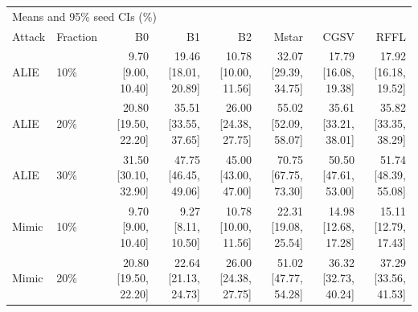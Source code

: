 \begin{tabular}{llrrrrrr}
\toprule
\multicolumn{8}{l}{Means and 95\% seed CIs (\%)} \\
Attack & Fraction & B0 & B1 & B2 & Mstar & CGSV & RFFL \\
\midrule
ALIE & 10\% & \shortstack{9.70\\{}[9.00, 10.40]} & \shortstack{19.46\\{}[18.01, 20.89]} & \shortstack{10.78\\{}[10.00, 11.56]} & \shortstack{32.07\\{}[29.39, 34.75]} & \shortstack{17.79\\{}[16.08, 19.38]} & \shortstack{17.92\\{}[16.18, 19.52]} \\
ALIE & 20\% & \shortstack{20.80\\{}[19.50, 22.20]} & \shortstack{35.51\\{}[33.55, 37.65]} & \shortstack{26.00\\{}[24.38, 27.75]} & \shortstack{55.02\\{}[52.09, 58.07]} & \shortstack{35.61\\{}[33.21, 38.01]} & \shortstack{35.82\\{}[33.35, 38.29]} \\
ALIE & 30\% & \shortstack{31.50\\{}[30.10, 32.90]} & \shortstack{47.75\\{}[46.45, 49.06]} & \shortstack{45.00\\{}[43.00, 47.00]} & \shortstack{70.75\\{}[67.75, 73.30]} & \shortstack{50.50\\{}[47.61, 53.00]} & \shortstack{51.74\\{}[48.39, 55.08]} \\
Mimic & 10\% & \shortstack{9.70\\{}[9.00, 10.40]} & \shortstack{9.27\\{}[8.11, 10.50]} & \shortstack{10.78\\{}[10.00, 11.56]} & \shortstack{22.31\\{}[19.08, 25.54]} & \shortstack{14.98\\{}[12.68, 17.28]} & \shortstack{15.11\\{}[12.79, 17.43]} \\
Mimic & 20\% & \shortstack{20.80\\{}[19.50, 22.20]} & \shortstack{22.64\\{}[21.13, 24.73]} & \shortstack{26.00\\{}[24.38, 27.75]} & \shortstack{51.02\\{}[47.77, 54.28]} & \shortstack{36.32\\{}[32.73, 40.24]} & \shortstack{37.29\\{}[33.56, 41.53]} \\

\end{tabular}
